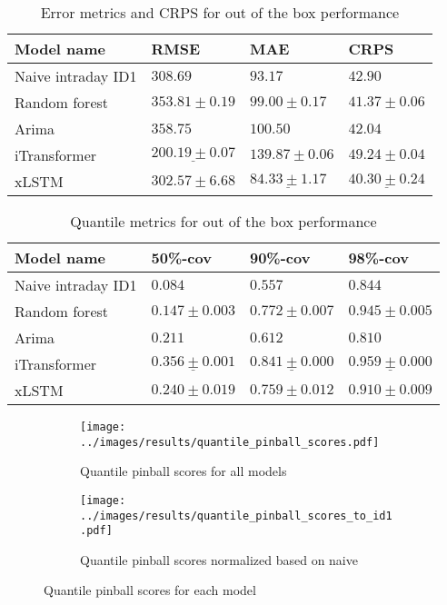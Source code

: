 \documentclass[class=scrbook, crop=false]{standalone}
\begin{document}
  
  \begin{table}[]
\centering
\begin{tabular}{l|l|l|l}
Model name 		&  RMSE 			& MAE 			& CRPS 			\\\hline
Naive intraday ID1 	&$ 308.69 			$&$ 93.17 			$&$ 42.90			$ \\
Random forest 		&$ 353.81 \pm 0.19	$&$  99.00	\pm 0.17	$&$ 41.37 \pm 0.06	$\\
Arima 			&$ 358.75 			$&$ 100.50 		$&$ 42.04  			$\\	
iTransformer 		&$ \underline{200.19 \pm 0.07}	$&$ 139.87	\pm 0.06	$&$ 49.24 \pm 0.04	$ \\
xLSTM 			&$ 302.57\pm 6.68	$&$ \underline{84.33 \pm 1.17}	$&$ \underline{40.30	\pm0.24} $\\
\end{tabular}
\caption{Error metrics and CRPS for out of the box performance}
\label{Table::Out_of_the_box_performance}
\end{table}
\begin{table}
\centering
\begin{tabular}{l|l|l|l}
Model name 		&  50\%-cov 		& 90\%-cov 		& 98\%-cov \\\hline
Naive intraday ID1 	&$ 0.084			$&$ 0.557 			$&$ 0.844			$ \\
Random forest 		&$ 0.147 \pm0.003	$&$ 0.772\pm 0.007	$&$ 0.945	 \pm 0.005	$\\
Arima 			&$ 0.211			$&$ 0.612	 		$&$0.810 			$\\	
iTransformer 		&$ \underline{0.356	\pm 0.001}	$&$ \underline{0.841	\pm 0.000}	$&$ \underline{0.959 \pm 0.000}	$ \\
xLSTM 			&$ 0.240 \pm 0.019	$&$ 0.759 	\pm 0.012	$&$ 0.910 \pm 0.009	 $\\
\end{tabular}
\caption{Quantile metrics for out of the box performance}
\label{Table::Out_of_the_box_performance_quantile}
\end{table}


\begin{figure}
  \centering
\begin{subfigure}{0.45\textwidth}
  \texttt{[image: ../images/results/quantile\_pinball\_scores.pdf]}
  \caption{Quantile pinball scores for all models}
\end{subfigure}
\begin{subfigure}{0.45\textwidth}
  \texttt{[image: ../images/results/quantile\_pinball\_scores\_to\_id1.pdf]}
  \caption{Quantile pinball scores normalized based on naive}
\end{subfigure}
\caption{Quantile pinball scores for each model}
\label{Figure::pinball_scores}
\end{figure}
\end{document}
